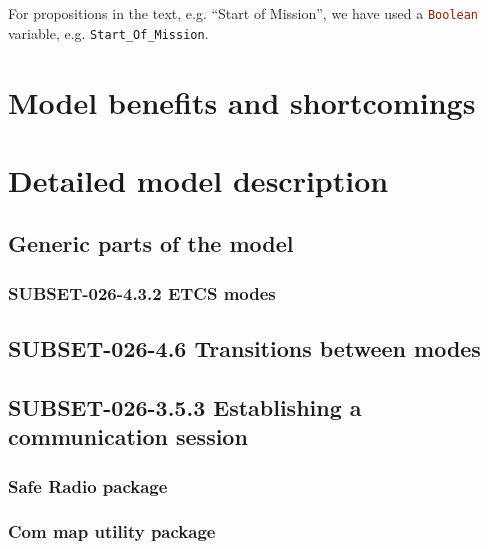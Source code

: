 \documentclass{template/openetcs_report}
\newcommand{\Ada}[1]{\lstinline[language=Ada,basicstyle={\sffamily},framesep=0pt]{#1}}
\begin{document}
For propositions in the text, e.g. ``Start of Mission'', we have used
a \Ada{Boolean} variable, e.g. \Ada{Start_Of_Mission}.

\chapter{Model benefits and shortcomings}

\chapter{Detailed model description}

\section{Generic parts of the model}






\subsection{SUBSET-026-4.3.2 ETCS modes}



\section{SUBSET-026-4.6 Transitions between modes}





\section{SUBSET-026-3.5.3 Establishing a communication session}

\subsection{Safe Radio package}




\subsection{Com map utility package}
\end{document}
